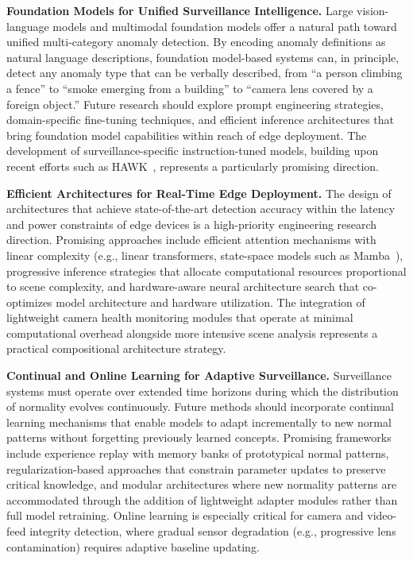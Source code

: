 \documentclass[10pt,a4paper]{article}
\begin{document}
\noindent\textbf{Foundation Models for Unified Surveillance Intelligence.} Large vision-language models and multimodal foundation models offer a natural path toward unified multi-category anomaly detection. By encoding anomaly definitions as natural language descriptions, foundation model-based systems can, in principle, detect any anomaly type that can be verbally described, from ``a person climbing a fence'' to ``smoke emerging from a building'' to ``camera lens covered by a foreign object.'' Future research should explore prompt engineering strategies, domain-specific fine-tuning techniques, and efficient inference architectures that bring foundation model capabilities within reach of edge deployment. The development of surveillance-specific instruction-tuned models, building upon recent efforts such as HAWK~\citep{tang2024hawk}, represents a particularly promising direction.

\noindent\textbf{Efficient Architectures for Real-Time Edge Deployment.} The design of architectures that achieve state-of-the-art detection accuracy within the latency and power constraints of edge devices is a high-priority engineering research direction. Promising approaches include efficient attention mechanisms with linear complexity (e.g., linear transformers, state-space models such as Mamba~\citep{gu2023mamba}), progressive inference strategies that allocate computational resources proportional to scene complexity, and hardware-aware neural architecture search that co-optimizes model architecture and hardware utilization. The integration of lightweight camera health monitoring modules that operate at minimal computational overhead alongside more intensive scene analysis represents a practical compositional architecture strategy.

\noindent\textbf{Continual and Online Learning for Adaptive Surveillance.} Surveillance systems must operate over extended time horizons during which the distribution of normality evolves continuously. Future methods should incorporate continual learning mechanisms that enable models to adapt incrementally to new normal patterns without forgetting previously learned concepts. Promising frameworks include experience replay with memory banks of prototypical normal patterns, regularization-based approaches that constrain parameter updates to preserve critical knowledge, and modular architectures where new normality patterns are accommodated through the addition of lightweight adapter modules rather than full model retraining. Online learning is especially critical for camera and video-feed integrity detection, where gradual sensor degradation (e.g., progressive lens contamination) requires adaptive baseline updating.
\end{document}
